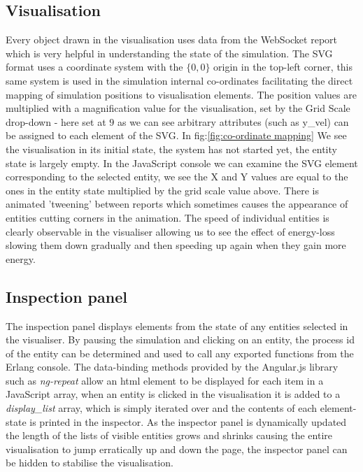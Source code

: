 \subsection{Visualisation}
Every object drawn in the visualisation uses data from the WebSocket report which is very helpful in understanding the state of the simulation. The SVG format uses a coordinate system with the \( \{ 0,0 \} \) origin in the top-left corner, this same system is used in the simulation internal co-ordinates facilitating the direct mapping of simulation positions to visualisation elements.
The position values are multiplied with a magnification value for the visualisation, set by the Grid Scale drop-down - here set at \(9\) as we can see arbitrary attributes (such as y\_vel) can be assigned to each element of the SVG. In fig:\ref{fig:co-ordinate mapping} We see the visualisation in its initial state, the system has not started yet, the entity state is largely empty. In the JavaScript console we can examine the SVG element corresponding to the selected entity, we see the X and Y values are equal to the ones in the entity state multiplied by the grid scale value above.
There is animated 'tweening' between reports which sometimes causes the appearance of entities cutting corners in the animation. The speed of individual entities is clearly observable in the visualiser allowing us to see the effect of energy-loss slowing them down gradually and then speeding up again when they gain more energy.
\subsection{Inspection panel}
\label{inspector_panel}
The inspection panel displays elements from the state of any entities selected in the visualiser. By pausing the simulation and clicking on an entity, the process id of the entity can be determined and used to call any exported functions from the Erlang console. The data-binding methods provided by the Angular.js library such as \emph{ng-repeat} allow an html element to be displayed for each item in a JavaScript array, when an entity is clicked in the visualisation it is added to a \emph{display\_list} array, which is simply iterated over and the contents of each element-state is printed in the inspector.
As the inspector panel is dynamically updated the length of the lists of visible entities grows and shrinks causing the entire visualisation to jump erratically up and down the page, the inspector panel can be hidden to stabilise the visualisation.
